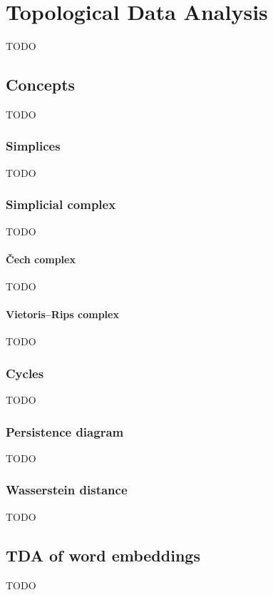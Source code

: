 \chapter{Topological Data Analysis}
TODO

\section{Concepts}
TODO

\subsection{Simplices}
TODO

\subsection{Simplicial complex}
TODO

\subsubsection{{\v C}ech complex}
TODO

\subsubsection{Vietoris–Rips complex}
TODO

\subsection{Cycles}
TODO

\subsection{Persistence diagram}
TODO

\subsection{Wasserstein distance}
TODO

\section{TDA of word embeddings}
TODO

